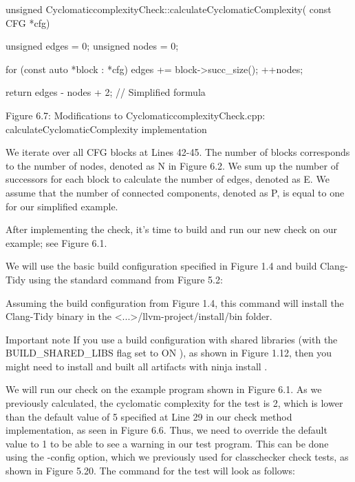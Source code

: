 \begin{cpp}
unsigned CyclomaticcomplexityCheck::calculateCyclomaticComplexity(
    const CFG *cfg) {
  unsigned edges = 0;
  unsigned nodes = 0;

  for (const auto *block : *cfg) {
    edges += block->succ_size();
    ++nodes;
  }

  return edges - nodes + 2;  // Simplified formula
}
\end{cpp}

\begin{center}
Figure 6.7: Modifications to CyclomaticcomplexityCheck.cpp: calculateCyclomaticComplexity implementation
\end{center}

We iterate over all CFG blocks at Lines 42-45. The number of blocks corresponds to the number of nodes, denoted as N in Figure 6.2. We sum up the number of successors for each block to calculate the number of edges, denoted as E. We assume that the number of connected components, denoted as P, is equal to one for our simplified example.

After implementing the check, it’s time to build and run our new check on our example; see Figure 6.1.


We will use the basic build configuration specified in Figure 1.4 and build Clang-Tidy using the standard command from Figure 5.2:


Assuming the build configuration from Figure 1.4, this command will install the Clang-Tidy binary in the <...>/llvm-project/install/bin folder.

\begin{myNotic}{Important note}
If you use a build configuration with shared libraries (with the BUILD\_SHARED\_LIBS flag set to ON ), as shown in Figure 1.12, then you might need to install and built all artifacts with ninja install .
\end{myNotic}

We will run our check on the example program shown in Figure 6.1. As we previously calculated, the cyclomatic complexity for the test is 2, which is lower than the default value of 5 specified at Line 29 in our check method implementation, as seen in Figure 6.6. Thus, we need to override the default value to 1 to be able to see a warning in our test program. This can be done using the -config option, which we previously used for classchecker check tests, as shown in Figure 5.20. The command for the test will look as follows:

